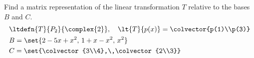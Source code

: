 Find a matrix representation of the linear transformation $T$ relative to the bases $B$ and $C$.
%
\begin{align*}
&\ltdefn{T}{P_2}{\complex{2}},\quad \lt{T}{p(x)}=\colvector{p(1)\\p(3)}\\
&B=\set{2-5x+x^2,\,1+x-x^2,\,x^2}\\
&C=\set{\colvector{3\\4},\,\colvector{2\\3}}
\end{align*}